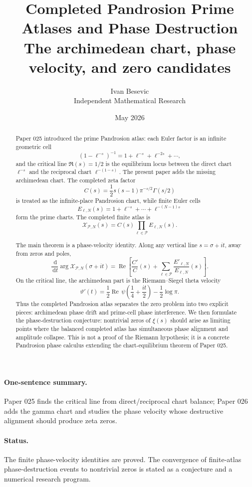 \documentclass[11pt]{article}
\title{Completed Pandrosion Prime Atlases and Phase Destruction\\[3pt]
\large The archimedean chart, phase velocity, and zero candidates}
\author{Ivan Besevic\\Independent Mathematical Research}
\date{May 2026}
\newcommand{\Pset}{\mathcal P}
\newcommand{\X}{\mathcal X}
\newcommand{\dd}{\,\mathrm d}
\DeclareMathOperator{\Ree}{Re}
\begin{document}
\maketitle

\begin{abstract}
Paper 025 introduced the prime Pandrosion atlas: each Euler factor is an
infinite geometric cell
\[
        (1-\ell^{-s})^{-1}
        =
        1+\ell^{-s}+\ell^{-2s}+\cdots,
\]
and the critical line \(\Re(s)=1/2\) is the equilibrium locus between the
direct chart \(\ell^{-s}\) and the reciprocal chart \(\ell^{-(1-s)}\).
The present paper adds the missing archimedean chart.  The completed zeta
factor
\[
        C(s)=\frac12 s(s-1)\pi^{-s/2}\Gamma(s/2)
\]
is treated as the infinite-place Pandrosion chart, while finite Euler cells
\[
        E_{\ell,N}(s)=1+\ell^{-s}+\cdots+\ell^{-(N-1)s}
\]
form the prime charts.  The completed finite atlas is
\[
        \X_{\Pset,N}(s)=C(s)\prod_{\ell\in\Pset}E_{\ell,N}(s).
\]

The main theorem is a phase-velocity identity.  Along any vertical line
\(s=\sigma+it\), away from zeros and poles,
\[
        \frac{\dd}{\dd t}\arg \X_{\Pset,N}(\sigma+it)
        =
        \Ree\left[
        \frac{C'}{C}(s)+
        \sum_{\ell\in\Pset}\frac{E'_{\ell,N}}{E_{\ell,N}}(s)
        \right].
\]
On the critical line, the archimedean part is the Riemann--Siegel theta
velocity
\[
        \vartheta'(t)
        =
        \frac12\Ree\,\psi\!\left(\frac14+\frac{it}{2}\right)
        -\frac12\log\pi.
\]
Thus the completed Pandrosion atlas separates the zero problem into two
explicit pieces: archimedean phase drift and prime-cell phase interference.
We then formulate the phase-destruction conjecture: nontrivial zeros of
\(\xi(s)\) should arise as limiting points where the balanced completed atlas
has simultaneous phase alignment and amplitude collapse.  This is not a proof
of the Riemann hypothesis; it is a concrete Pandrosion phase calculus extending
the chart-equilibrium theorem of Paper 025.
\end{abstract}

\paragraph{One-sentence summary.}
Paper 025 finds the critical line from direct/reciprocal chart balance; Paper
026 adds the gamma chart and studies the phase velocity whose destructive
alignment should produce zeta zeros.

\paragraph{Status.}
The finite phase-velocity identities are proved.  The convergence of
finite-atlas phase-destruction events to nontrivial zeros is stated as a
conjecture and a numerical research program.
\end{document}
